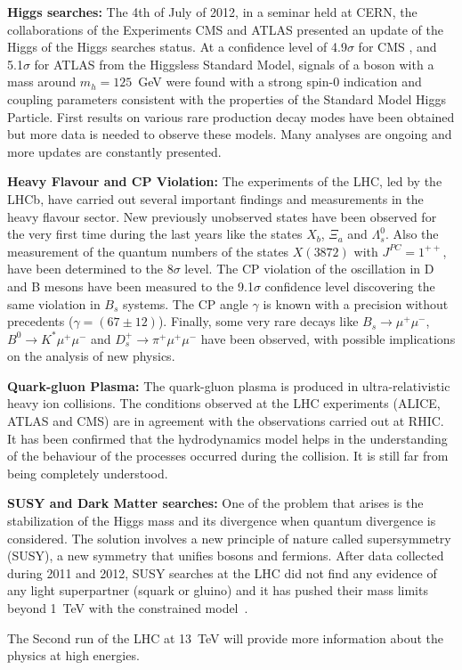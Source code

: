 \textbf{Higgs searches:} The 4th of July of 2012, in a seminar held at CERN, the collaborations of the Experiments CMS and ATLAS presented an update of the Higgs of the Higgs searches status. At a confidence level of 4.9$\sigma$ for CMS \cite{TheCMSCollaboration21122012}, and 5.1$\sigma$ for ATLAS \cite{TheATLASCollaboration21122012} from the Higgsless Standard Model, signals of a boson with a mass around $m_h=125$~GeV were found with a strong spin-0 indication and coupling parameters consistent with the properties of the Standard Model Higgs Particle. First results on various rare production decay modes have been obtained but more data is needed to observe these models. Many analyses are ongoing and more updates are constantly presented.\par
\textbf{Heavy Flavour and CP Violation:} The experiments of the LHC, led by the LHCb, have carried out several important findings and measurements in the heavy flavour sector. New previously unobserved states have been observed for the very first time during the last years like the states $X_b$, $\Xi_a$ and $\Lambda_s^0$. Also the measurement of the quantum numbers of the states $X(3872)$ with $J^{PC}=1^{++}$, have been determined to the 8$\sigma$ level. The CP violation of the oscillation in D and B mesons have been measured to the 9.1$\sigma$ confidence level discovering the same violation in $B_s$ systems. The CP angle $\gamma$ is known with a precision without precedents ($\gamma=(67\pm12)$\textdegree). Finally, some very rare decays like $B_s\rightarrow\mu^+\mu^-$, $B^0\rightarrow K^*\mu^+\mu^-$ and $D_s^+\rightarrow\pi^+\mu^+\mu^-$ have been observed, with possible implications on the analysis of new physics.\par
\textbf{Quark-gluon Plasma:} The quark-gluon plasma is produced in ultra-relativistic heavy ion collisions. The conditions observed at the LHC experiments (ALICE, ATLAS and CMS) are in agreement with the observations carried out at RHIC. It has been confirmed that the hydrodynamics model helps in the understanding of the behaviour of the processes occurred during the collision. It is still far from being completely understood.\par
\textbf{SUSY and Dark Matter searches:} One of the problem that arises is the stabilization of the Higgs mass and its divergence when quantum divergence is considered. The solution involves a new principle of nature called supersymmetry (SUSY), a new symmetry that unifies bosons and fermions. After data collected during 2011 and 2012, SUSY searches at the LHC did not find any evidence of any light superpartner (squark or gluino) and it has pushed their mass limits beyond 1~TeV with the constrained model~\cite{Kraml:2012er}.\par
\vspace*{0.6cm}
The Second run of the LHC at 13~TeV will provide more information about the physics at high energies.\par

